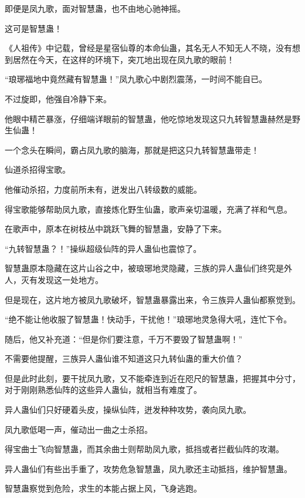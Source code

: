 
\begin{this_body}



即便是凤九歌，面对智慧蛊，也不由地心驰神摇。

这可是智慧蛊！

《人祖传》中记载，曾经是星宿仙尊的本命仙蛊，其名无人不知无人不晓，没有想到居然在今天，在这样的环境下，突兀地出现在凤九歌的眼前！

“琅琊福地中竟然藏有智慧蛊！”凤九歌心中剧烈震荡，一时间不能自已。

不过旋即，他强自冷静下来。

他眼中精芒暴涨，仔细端详眼前的智慧蛊，他吃惊地发现这只九转智慧蛊赫然是野生仙蛊！

一个念头在瞬间，霸占凤九歌的脑海，那就是把这只九转智慧蛊带走！

仙道杀招得宝歌。

他催动杀招，力度前所未有，迸发出八转级数的威能。

得宝歌能够帮助凤九歌，直接炼化野生仙蛊，歌声亲切温暖，充满了祥和气息。

在歌声中，原本在树枝丛中跳跃飞舞的智慧蛊，安静了下来。

“九转智慧蛊？！”操纵超级仙阵的异人蛊仙也震惊了。

智慧蛊原本隐藏在这片山谷之中，被琅琊地灵隐藏，三族的异人蛊仙们终究是外人，灭有发现这一处地方。

但是现在，这片地方被凤九歌破坏，智慧蛊暴露出来，令三族异人蛊仙都察觉到。

“绝不能让他收服了智慧蛊！快动手，干扰他！”琅琊地灵急得大吼，连忙下令。

随后，他又补充道：“但是你们要注意，千万不要毁了智慧蛊啊！”

不需要他提醒，三族异人蛊仙谁不知道这只九转仙蛊的重大价值？

但是此时此刻，要干扰凤九歌，又不能牵连到近在咫尺的智慧蛊，把握其中分寸，对于刚刚熟悉仙阵的这些异人蛊仙，就相当有难度了。

异人蛊仙们只好硬着头皮，操纵仙阵，迸发种种攻势，袭向凤九歌。

凤九歌低喝一声，催动出一曲之士杀招。

得宝曲士飞向智慧蛊，而其余曲士则帮助凤九歌，抵挡或者拦截仙阵的攻潮。

异人蛊仙们有些出手重了，攻势危急智慧蛊，凤九歌还主动抵挡，维护智慧蛊。

智慧蛊察觉到危险，求生的本能占据上风，飞身逃跑。


\end{this_body}
